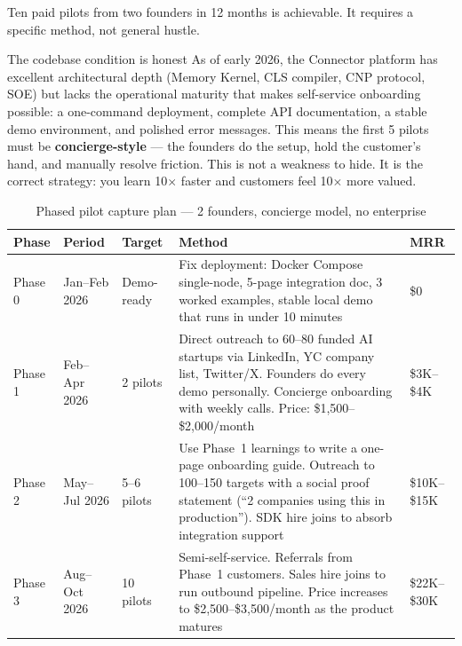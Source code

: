 Ten paid pilots from two founders in 12 months is achievable. It requires
a specific method, not general hustle.

\begin{warnbox}{The codebase condition is honest}
As of early 2026, the Connector platform has excellent architectural depth
(Memory Kernel, CLS compiler, CNP protocol, SOE) but lacks the operational
maturity that makes self-service onboarding possible: a one-command
deployment, complete API documentation, a stable demo environment, and
polished error messages. This means the first 5 pilots must be
\textbf{concierge-style} --- the founders do the setup, hold the customer's
hand, and manually resolve friction. This is not a weakness to hide. It
is the correct strategy: you learn 10$\times$ faster and customers feel
10$\times$ more valued.
\end{warnbox}

\begin{table}[H]
\centering
\renewcommand{\arraystretch}{1.5}
\begin{tabularx}{\textwidth}{@{}lllXl@{}}
\toprule
\textbf{Phase} & \textbf{Period} & \textbf{Target} & \textbf{Method} & \textbf{MRR} \\
\midrule
Phase 0 & Jan--Feb 2026 & Demo-ready & Fix deployment: Docker Compose
  single-node, 5-page integration doc, 3 worked examples, stable local demo
  that runs in under 10 minutes & \$0 \\
Phase 1 & Feb--Apr 2026 & 2 pilots & Direct outreach to 60--80 funded AI
  startups via LinkedIn, YC company list, Twitter/X. Founders do every
  demo personally. Concierge onboarding with weekly calls. Price:
  \$1,500--\$2,000/month & \$3K--\$4K \\
Phase 2 & May--Jul 2026 & 5--6 pilots & Use Phase~1 learnings to write a
  one-page onboarding guide. Outreach to 100--150 targets with a social
  proof statement (``2 companies using this in production''). SDK hire
  joins to absorb integration support & \$10K--\$15K \\
Phase 3 & Aug--Oct 2026 & 10 pilots & Semi-self-service. Referrals from
  Phase~1 customers. Sales hire joins to run outbound pipeline. Price
  increases to \$2,500--\$3,500/month as the product matures &
  \$22K--\$30K \\
\bottomrule
\end{tabularx}
\caption{Phased pilot capture plan --- 2 founders, concierge model, no enterprise}
\end{table}

